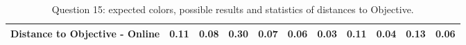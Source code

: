 \begin{table}[H]
{\begin{tabular}{lccccccccccccc}
    \multicolumn{4}{l}{Distance to Objective - Online}                                                                                               & \multicolumn{1}{|c}{0.11}        & \multicolumn{1}{c|}{0.08}    & \multicolumn{1}{|c}{0.30}        & \multicolumn{1}{c|}{0.07}    & \multicolumn{1}{|c}{\textbf{0.06}}       & \multicolumn{1}{c|}{0.03}    & \multicolumn{1}{|c}{0.11}        & \multicolumn{1}{c|}{0.04}    & \multicolumn{1}{|c}{0.13}       & \multicolumn{1}{c|}{0.06}    \\ \hline
    \end{tabular}}
  \caption[Question 15, with expected Results.]{Question 15: expected colors, possible results and statistics of distances to Objective.}
  \vspace{-5pt}
  \label{table:lab_q15_expected}
\end{table}
%

